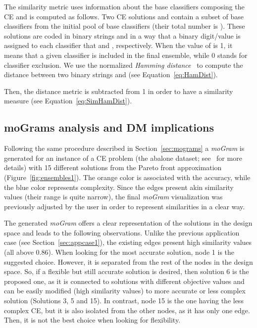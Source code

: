 \documentclass[journal]{IEEEtran}
\begin{document}
The similarity metric uses information about the base classifiers composing the CE and is computed as follows. Two CE solutions  and  contain a subset of base classifiers from the initial pool of base classifiers (their total number is ). These solutions are coded in binary strings  and  in a way that a binary digit/value  is assigned to each classifier that  and , respectively. When the value of  is 1, it means that a given classifier is included in the final ensemble, while 0 stands for classifier exclusion. We use the normalized \emph{Hamming distance}~\cite{hamming50} to compute the distance between two binary strings  and  (see Equation~\ref{eq:HamDist}).  



Then, the distance metric  is subtracted from 1 in order to have a similarity measure  (see Equation~\ref{eq:SimHamDist}). 




\subsection{moGrams analysis and DM implications}


Following the same procedure described in Section~\ref{sec:mograms} a \emph{moGram} is generated for an instance of a CE problem (the abalone dataset; see~\cite{Trawinski11} for more details) with 15 different solutions from the Pareto front approximation (Figure~\ref{fig:ensembles1}). The orange color is associated with the accuracy, while the blue color represents complexity. Since the edges present akin similarity values (their range is quite narrow), the final \emph{moGram} visualization was previously adjusted by the user in order to represent similarities in a clear way. 

The generated \emph{moGram} offers a clear representation of the solutions in the design space and leads to the following observations. Unlike the previous application case (see Section~\ref{sec:appcase1}), the existing edges present high similarity values (all above 0.86).  
When looking for the most accurate solution, node 1 is the suggested choice. However, it is separated from the rest of the nodes in the design space. So, if a flexible but still accurate solution is desired, then solution 6 is the proposed one, as it is connected to solutions with different objective values and can be easily modified (high similarity values) to more accurate or less complex solution (Solutions 3, 5 and 15).
In contrast, node 15 is the one having the less complex CE, but it is also isolated from the other nodes, as it has only one edge. Then, it is not the best choice when looking for flexibility.
\end{document}
